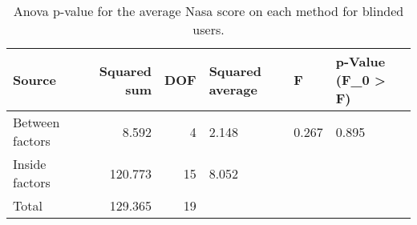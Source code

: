 
\begin{table}[!htb]
\centering
\caption{Anova p-value for the average Nasa score on each method for blinded users.}
\label{tab:anova_nasa_avg}
\begin{tabular}{lrrlll}
\toprule
         Source &  Squared sum &  DOF & Squared average &     F & p-Value (F\_0 > F) \\
\midrule
Between factors &        8.592 &    4 &           2.148 & 0.267 &             0.895 \\
 Inside factors &      120.773 &   15 &           8.052 &       &                   \\
          Total &      129.365 &   19 &                 &       &                   \\
\bottomrule
\end{tabular}
\end{table}

